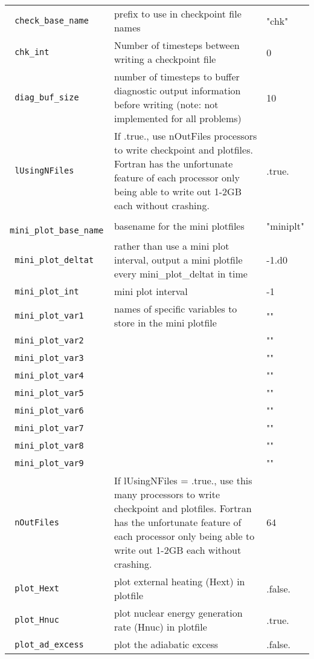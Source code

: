 \begin{landscape}
{\begin{center}
\begin{longtable}{|l|p{5.25in}|l|}
\rowcolor{tableShade}
\verb= check_base_name = &  prefix to use in checkpoint file names & "chk" \\
\verb= chk_int = &  Number of timesteps between writing a checkpoint file & 0 \\
\rowcolor{tableShade}
\verb= diag_buf_size = &  number of timesteps to buffer diagnostic output information before writing (note: not implemented for all problems) & 10 \\
\verb= lUsingNFiles = &  If .true., use nOutFiles processors to write checkpoint and plotfiles. Fortran has the unfortunate feature of each processor only being able to write out 1-2GB each without crashing. & .true. \\
\rowcolor{tableShade}
\verb= mini_plot_base_name = &  basename for the mini plotfiles & "miniplt" \\
\verb= mini_plot_deltat = &  rather than use a mini plot interval, output a mini plotfile every mini\_plot\_deltat in time & -1.d0 \\
\rowcolor{tableShade}
\verb= mini_plot_int = &  mini plot interval & -1 \\
\verb= mini_plot_var1 = &  names of specific variables to store in the mini plotfile & "" \\
\rowcolor{tableShade}
\verb= mini_plot_var2 = &  & "" \\
\verb= mini_plot_var3 = &  & "" \\
\rowcolor{tableShade}
\verb= mini_plot_var4 = &  & "" \\
\verb= mini_plot_var5 = &  & "" \\
\rowcolor{tableShade}
\verb= mini_plot_var6 = &  & "" \\
\verb= mini_plot_var7 = &  & "" \\
\rowcolor{tableShade}
\verb= mini_plot_var8 = &  & "" \\
\verb= mini_plot_var9 = &  & "" \\
\rowcolor{tableShade}
\verb= nOutFiles = &  If lUsingNFiles = .true., use this many processors to write checkpoint and plotfiles.  Fortran has the unfortunate feature of each processor only being able to write out 1-2GB each without crashing. & 64 \\
\verb= plot_Hext = &  plot external heating (Hext) in plotfile & .false. \\
\rowcolor{tableShade}
\verb= plot_Hnuc = &  plot nuclear energy generation rate (Hnuc) in plotfile & .true. \\
\verb= plot_ad_excess = &  plot the adiabatic excess & .false. \\

\end{longtable}
\end{center}}
\end{landscape}

